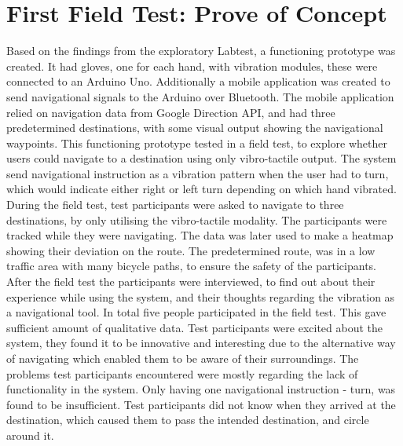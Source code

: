 \documentclass{sigchi}
\begin{document}
\section{First Field Test: Prove of Concept}
Based on the findings from the exploratory Labtest, a functioning prototype was created. It had gloves, one for each hand, with vibration modules, these were connected to an Arduino Uno. Additionally a mobile application was created to send navigational signals to the Arduino over Bluetooth. The mobile application relied on navigation data from Google Direction API, and had three predetermined destinations, with some visual output showing the navigational waypoints. 
\newline
\newline 
This functioning prototype tested in a field test, to explore whether users could navigate to a destination using only vibro-tactile output. The system send navigational instruction as a vibration pattern when the user had to turn, which would indicate either right or left turn depending on which hand vibrated. 
\newline
\newline 
During the field test, test participants were asked to navigate to three destinations, by only utilising the vibro-tactile modality. The participants were tracked while they were navigating. The data was later used to make a heatmap showing their deviation on the route. The predetermined route, was in a low traffic area with many bicycle paths, to ensure the safety of the participants. 
\newline
\newline 
After the field test the participants were interviewed, to find out about their experience while using the system, and their thoughts regarding the vibration as a navigational tool. 
\newline
\newline  
In total five people participated in the field test. This gave sufficient amount of qualitative data. Test participants were excited about the system, they found it to be innovative and interesting due to the alternative way of navigating which enabled them to be aware of their surroundings.
\newline
\newline  
The problems test participants encountered were mostly regarding the lack of functionality in the system. Only having one navigational instruction - turn, was found to be insufficient. Test participants did not know when they arrived at the destination, which caused them to pass the intended destination, and circle around it.
\end{document}

